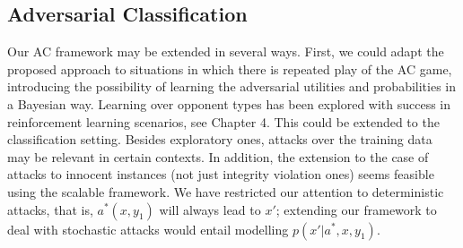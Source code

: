 \subsection{Adversarial Classification}
Our AC framework may be extended in several ways. First, we could adapt the proposed approach to situations in which there is repeated play of the AC game, introducing the possibility of learning the adversarial utilities and probabilities in a Bayesian way. Learning over opponent types has been explored with success in reinforcement learning scenarios, see Chapter 4. This could be extended to the classification setting. Besides exploratory ones, attacks over the training data \parencite{biggio2012poisoning} may be relevant in certain contexts. 
In addition, the extension to the case of attacks to innocent instances (not just integrity violation ones) seems feasible using the scalable framework. %
We have restricted our attention to deterministic attacks, that is, $a^*(x,y_1)$ will always lead to $x'$; extending our framework to deal with stochastic attacks would entail modelling $p(x' \vert a^*, x, y_1)$. 




